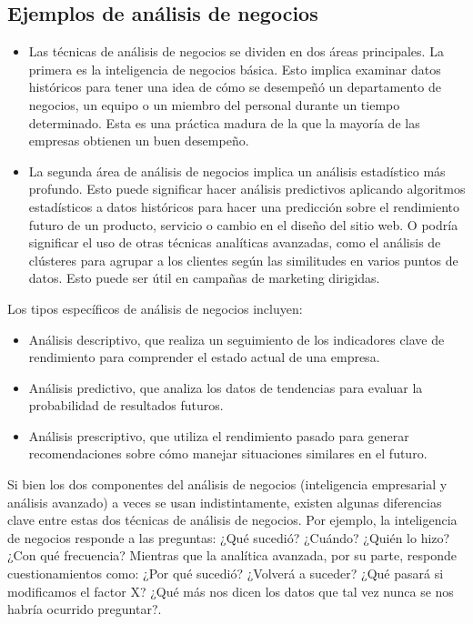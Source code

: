 \documentclass[twoside,twocolumn]{article}
\begin{document}
\subsection{Ejemplos de análisis de negocios}

\begin{itemize}	
	\item Las técnicas de análisis de negocios se dividen en dos áreas principales. La primera es la inteligencia de negocios básica. Esto implica examinar datos históricos para tener una idea de cómo se desempeñó un departamento de negocios, un equipo o un miembro del personal durante un tiempo determinado. Esta es una práctica madura de la que la mayoría de las empresas obtienen un buen desempeño.
	\item La segunda área de análisis de negocios implica un análisis estadístico más profundo. Esto puede significar hacer análisis predictivos aplicando algoritmos estadísticos a datos históricos para hacer una predicción sobre el rendimiento futuro de un producto, servicio o cambio en el diseño del sitio web. O podría significar el uso de otras técnicas analíticas avanzadas, como el análisis de clústeres para agrupar a los clientes según las similitudes en varios puntos de datos. Esto puede ser útil en campañas de marketing dirigidas.
\end{itemize} 

Los tipos específicos de análisis de negocios incluyen:
\begin{itemize}	
	\item Análisis descriptivo, que realiza un seguimiento de los indicadores clave de rendimiento para comprender el estado actual de una empresa.
	\item Análisis predictivo, que analiza los datos de tendencias para evaluar la probabilidad de resultados futuros.
	\item Análisis prescriptivo, que utiliza el rendimiento pasado para generar recomendaciones sobre cómo manejar situaciones similares en el futuro.
\end{itemize} 


Si bien los dos componentes del análisis de negocios (inteligencia empresarial y análisis avanzado) a veces se usan indistintamente, existen algunas diferencias clave entre estas dos técnicas de análisis de negocios. Por ejemplo, la inteligencia de negocios responde a las preguntas: ¿Qué sucedió? ¿Cuándo? ¿Quién lo hizo? ¿Con qué frecuencia? Mientras que la analítica avanzada, por su parte, responde cuestionamientos como: ¿Por qué sucedió? ¿Volverá a suceder? ¿Qué pasará si modificamos el factor X? ¿Qué más nos dicen los datos que tal vez nunca se nos habría ocurrido preguntar?.
\end{document}
